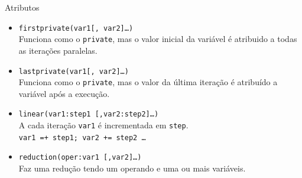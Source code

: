 \documentclass{beamer}
\begin{document}
\begin{frame}[fragile]{Atributos}
\begin{itemize}
	\item \texttt{firstprivate(var1[, var2]\ldots)} \\
        Funciona como o \texttt{private}, mas o valor inicial da variável é
        atribuido a todas as iterações paralelas.
	\item \texttt{lastprivate(var1[, var2]\ldots)} \\
        Funciona como o \texttt{private}, mas o valor da última iteração é
        atribuído a variável após a execução.
	\item \texttt{linear(var1:step1 [,var2:step2]\ldots)} \\
		A cada iteração \texttt{var1} é incrementada em \texttt{step}. \\
		\texttt{var1 =+ step1; var2 += step2 \ldots}
	\item \texttt{reduction(oper:var1 [,var2]\ldots)} \\
		Faz uma redução tendo um operando e uma ou mais variáveis.
\end{itemize}
\end{frame}
\end{document}
